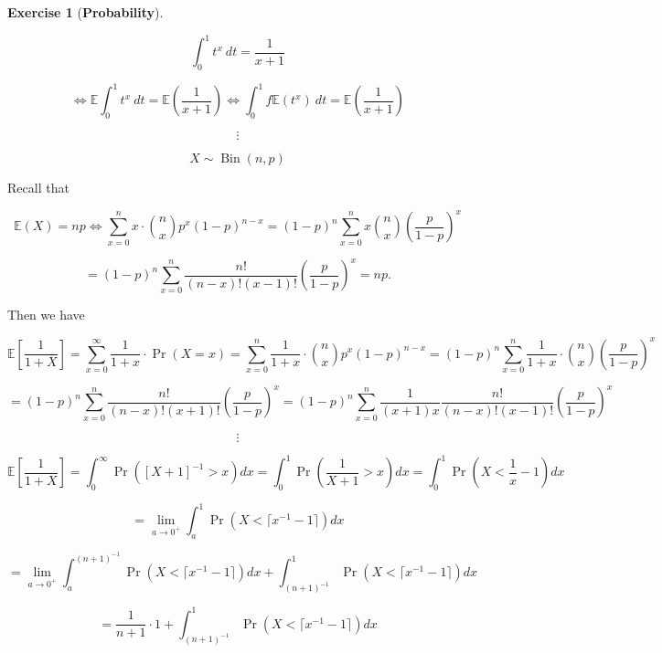 \documentclass{article}
\theoremstyle{definition}
\newtheorem{exercise}{Exercise}
\theoremstyle{definition}
\theoremstyle{definition}
\theoremstyle{definition}
\newcommand{\E}{\mathbb{E}}
\begin{document}
\begin{exercise}[\textbf{Probability}]
\begin{enumerate}[(a)]
\[
\int_0^1 t^x  \ dt = \frac{1}{x+1}
\]

\[
 \iff \E \int_0^1 t^x  \ dt = \E \left( \frac{1}{x+1} \right)  \iff \int_0^1f \E ( t^x)  \ dt = \E \left( \frac{1}{x+1} \right)
\]

\[
\vdots
\]

\[
X \sim \operatorname{Bin}(n, p)
\]

Recall that 

\[
\E(X) = np \iff \sum_{x=0}^n x \cdot \binom{n}{x} p^x(1-p)^{n-x} =  (1-p)^n\sum_{x=0}^n x \binom{n}{x} \left( \frac{p}{1-p} \right)^x
\]

\[
=  (1-p)^n\sum_{x=0}^n \frac{n!}{(n-x)!(x-1)!} \left( \frac{p}{1-p} \right)^x  = np.
\]

Then we have

\[
\E \left[ \frac{1}{1 + X} \right] = \sum_{x=0}^\infty \frac{1}{1 + x} \cdot \Pr(X=x) = \sum_{x=0}^n \frac{1}{1 + x} \cdot \binom{n}{x} p^x(1-p)^{n-x} = (1-p)^n\sum_{x=0}^n \frac{1}{1 + x} \cdot \binom{n}{x} \left( \frac{p}{1-p} \right)^x
\]

\[
= (1-p)^n\sum_{x=0}^n  \frac{n!}{(n-x)!(x+1)!}\left( \frac{p}{1-p} \right)^x  = (1-p)^n\sum_{x=0}^n \frac{1}{(x+1)x} \frac{n!}{(n-x)!(x-1)!}\left( \frac{p}{1-p} \right)^x
\]



\[
\vdots
\]

\[
\E \left[ \frac{1}{1 + X} \right] = \int_{0}^\infty \Pr\left( [X+1]^{-1} > x \right) dx = \int_{0}^{1} \Pr\left( \frac{1}{X+1} > x \right)  dx  = \int_{0}^{1} \Pr\left( X < \frac{1}{x} - 1\right)   dx
\]

\[
= \lim_{a \to 0^+} \int_{a}^{1} \Pr \left( X < \lceil x^{-1} - 1\rceil \right) dx
\]

\[
 = \lim_{a \to 0^+} \int_{a}^{(n+1)^{-1}} \Pr \left( X < \lceil x^{-1} - 1\rceil \right) dx + \int_{(n+1)^{-1}}^{1} \Pr \left( X < \lceil x^{-1} - 1\rceil \right) dx 
 \]
 
 \[
 = \frac{1}{n+1} \cdot 1 + \int_{(n+1)^{-1}}^{1} \Pr \left( X < \lceil x^{-1} - 1\rceil \right) dx 
 \]

%


\end{enumerate}
\end{exercise}
\end{document}
